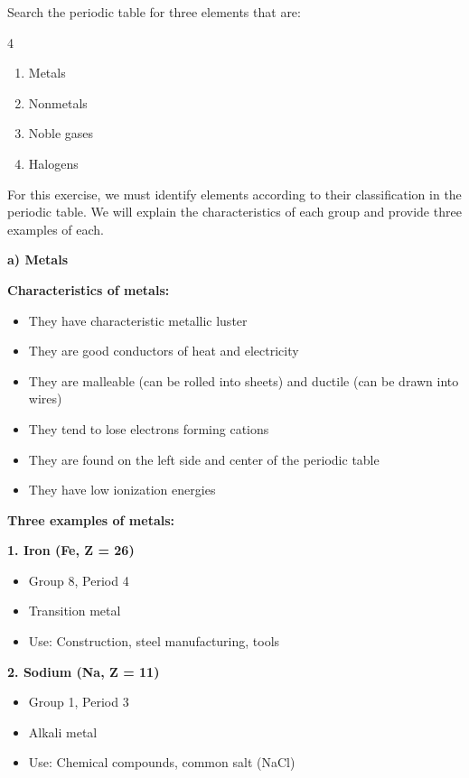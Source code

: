 \begin{exercise}
    Search the periodic table for three elements that are:
    \begin{multicols}{4}
        \begin{enumerate}[label=\letraminuscula]
    \item Metals
    \item Nonmetals
    \item Noble gases
    \item Halogens
        \end{enumerate}
    \end{multicols}
    \begin{solu}
        For this exercise, we must identify elements according to their classification in the periodic table. We will explain the characteristics of each group and provide three examples of each.

        \textbf{a) Metals}

        \textbf{Characteristics of metals:}
        \begin{itemize}
            \item They have characteristic metallic luster
            \item They are good conductors of heat and electricity
            \item They are malleable (can be rolled into sheets) and ductile (can be drawn into wires)
            \item They tend to lose electrons forming cations
            \item They are found on the left side and center of the periodic table
            \item They have low ionization energies
        \end{itemize}

        \textbf{Three examples of metals:}

        \textbf{1. Iron (Fe, Z = 26)}
        \begin{itemize}
            \item Group 8, Period 4
            \item Transition metal
            \item Use: Construction, steel manufacturing, tools
        \end{itemize}

        \textbf{2. Sodium (Na, Z = 11)}
        \begin{itemize}
            \item Group 1, Period 3
            \item Alkali metal
            \item Use: Chemical compounds, common salt (NaCl)
        \end{itemize}


\end{solu}
\end{exercise}
